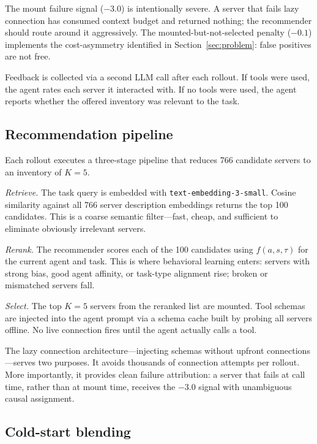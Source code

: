 \documentclass{article} %
\begin{document}
The mount failure signal ($-3.0$) is intentionally severe. A server that fails lazy connection has consumed context budget and returned nothing; the recommender should route around it aggressively. The mounted-but-not-selected penalty ($-0.1$) implements the cost-asymmetry identified in Section~\ref{sec:problem}: false positives are not free.

Feedback is collected via a second LLM call after each rollout. If tools were used, the agent rates each server it interacted with. If no tools were used, the agent reports whether the offered inventory was relevant to the task.

\subsection{Recommendation pipeline}
\label{sec:pipeline}

Each rollout executes a three-stage pipeline that reduces 766 candidate servers to an inventory of $K = 5$.

\textit{Retrieve.} The task query is embedded with \texttt{text-embedding-3-small}. Cosine similarity against all 766 server description embeddings returns the top 100 candidates. This is a coarse semantic filter---fast, cheap, and sufficient to eliminate obviously irrelevant servers.

\textit{Rerank.} The recommender scores each of the 100 candidates using $f(a, s, \tau)$ for the current agent and task. This is where behavioral learning enters: servers with strong bias, good agent affinity, or task-type alignment rise; broken or mismatched servers fall.

\textit{Select.} The top $K = 5$ servers from the reranked list are mounted. Tool schemas are injected into the agent prompt via a schema cache built by probing all servers offline. No live connection fires until the agent actually calls a tool.

The lazy connection architecture---injecting schemas without upfront connections---serves two purposes. It avoids thousands of connection attempts per rollout. More importantly, it provides clean failure attribution: a server that fails at call time, rather than at mount time, receives the $-3.0$ signal with unambiguous causal assignment.


\subsection{Cold-start blending}
\label{sec:coldstart}
\end{document}
